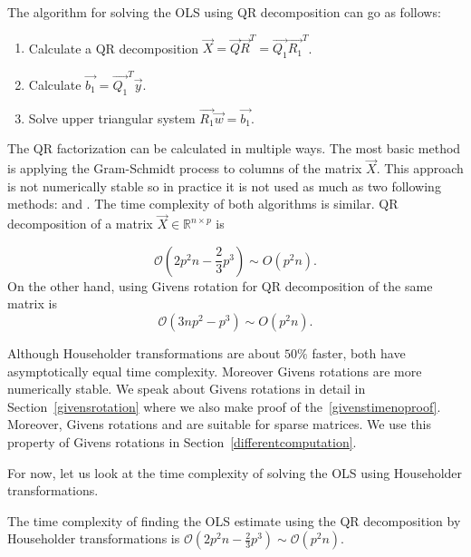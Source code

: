 
The algorithm for solving the OLS using QR decomposition can go as follows:
\begin{enumerate}
  \item Calculate a QR decomposition $\vec{X} = \vec{Q}\vec{R}^T = \vec{Q_1}\vec{R_1}^T$.
  \item Calculate $\vec{b_1} = \vec{Q_1}^T \vec{y}$.
  \item Solve upper triangular system $\vec{R_1}\vec{w} = \vec{b_1}$.
\end{enumerate}

The QR factorization can be calculated in multiple ways. The most basic method is applying the Gram-Schmidt process to columns of the matrix $\vec{X}$. This approach is not numerically stable so in practice it is not used as much as two following methods:  and .
The time complexity of both algorithms is similar. QR decomposition of a matrix $\vec{X} \in \mathbb{R}^{n \times p}$ is~\cite{businger1965linear}

\begin{equation} \label{qrtimewhat}
    \mathcal{O}(2p^2n - \frac{2}{3}p^3) \sim {O}(p^2n).
\end{equation}
On the other hand, using Givens rotation for QR decomposition of the same matrix is 
\begin{equation} \label{givenstimenoproof}
    \mathcal{O}(3np^2 - p^3) \sim {O}(p^2n).
\end{equation}

Although Householder transformations are about $50\%$ faster, both have asymptotically equal time complexity. Moreover Givens rotations are more numerically stable. 
We speak about Givens rotations in detail in Section~\ref{givensrotation} where we also make proof of the~\eqref{givenstimenoproof}. Moreover, Givens rotations and are suitable for sparse matrices. We use this property of Givens rotations in Section~\ref{differentcomputation}. 

For now, let us look at the time complexity of solving the OLS using Householder transformations. 
\begin{observation}
    The time complexity of finding the OLS estimate using the QR decomposition by Householder transformations is $\mathcal{O}(2p^2n - \frac{2}{3}p^3) \sim \mathcal{O}(p^2n)$.
\end{observation}

